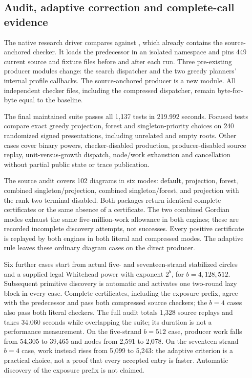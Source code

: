 \subsection{Audit, adaptive correction and complete-call evidence}

The native  research driver compares
against , which already contains the source-anchored checker.
It loads the predecessor in an isolated namespace and pins 449 current source
and fixture files before and after each run. Three pre-existing producer
modules change: the search dispatcher and the two greedy planners' internal
profile callbacks. The source-anchored producer is a new module. All independent
checker files, including the compressed dispatcher, remain byte-for-byte equal
to the baseline.

The final maintained suite passes all 1,137 tests in 219.992 seconds. Focused
tests compare exact greedy projection, forest and singleton-priority choices
on 240 randomized signed presentations, including unrelated and empty roots.
Other cases cover binary powers, checker-disabled production, producer-disabled
source replay, unit-versus-growth dispatch, node/work exhaustion and cancellation
without partial public state or trace publication.

The source audit covers 102 diagrams in six modes: default, projection,
forest, combined singleton/projection, combined singleton/forest, and projection
with the rank-two terminal disabled. Both packages return identical complete
certificates or the same absence of a certificate. The two combined Gordian
modes exhaust the same five-million-work allowance in both engines; these
are recorded incomplete discovery attempts, not successes. Every positive
certificate is replayed by both engines in both literal and compressed modes.
The adaptive rule leaves these ordinary diagram cases on the direct producer.

Six further cases start from actual five- and seventeen-strand stabilized
circles and a supplied legal Whitehead power with exponent $2^b$, for
$b=4,128,512$. Subsequent primitive discovery is automatic and activates one
two-round lazy block in every case. Complete certificates, including the
exposure prefix, agree with the predecessor and pass both compressed source
checkers; the $b=4$ cases also pass both literal checkers. The full audit totals
1,328 source replays and takes 34.060 seconds while overlapping the suite;
its duration is not a performance measurement. On the five-strand $b=512$
case, producer work falls from 54,305 to 39,465 and nodes from 2,591 to 2,078.
On the seventeen-strand $b=4$ case, work instead rises from 5,099 to 5,243:
the adaptive criterion is a practical choice, not a proof that every accepted
entry is faster. Automatic discovery of the exposure prefix is not claimed.

